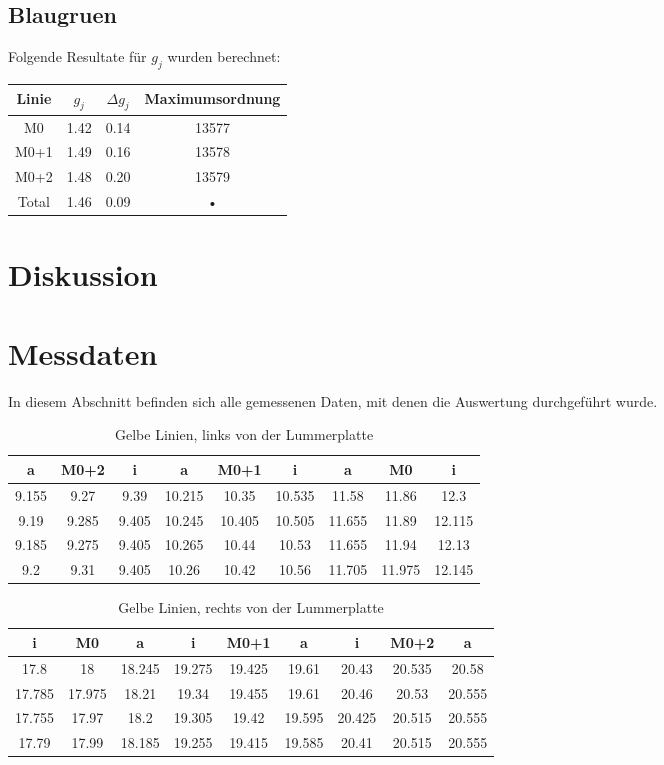\documentclass[a4paper,parskip,11pt, DIV12]{scrreprt}
\begin{document}
	\section{Blaugruen}
	Folgende Resultate für $g_j$ wurden berechnet:
	
\begin{tabular}{|c|c|c|c|}
\hline 
Linie  & $g_j$ & $\Delta g_j$ & Maximumsordnung \\ 
\hline 
M0 & 1.42 & 0.14 & 13577 \\ 
\hline 
M0+1 & 1.49 & 0.16 & 13578 \\ 
\hline 
M0+2 & 1.48 & 0.20 & 13579 \\ 
\hline 
Total & 1.46 & 0.09 & • \\ 
\hline 
\end{tabular} 

	\chapter{Diskussion}
	
	\chapter{Messdaten}
	In diesem Abschnitt befinden sich alle gemessenen Daten, mit denen die Auswertung durchgeführt wurde.
	
	\begin{table}[H]
	\begin{tabular}{|c|c|c||c|c|c||c|c|c|}
	\hline 
a	&	M0+2	&	i	&	a	&	M0+1	&	i	&	a	&	M0	&	i	\\
	\hline
	\hline
9.155	&	9.27	&	9.39	&	10.215	&	10.35	&	10.535	&	11.58	&	11.86	&	12.3	\\
	\hline
9.19	&	9.285	&	9.405	&	10.245	&	10.405	&	10.505	&	11.655	&	11.89	&	12.115	\\
	\hline
9.185	&	9.275	&	9.405	&	10.265	&	10.44	&	10.53	&	11.655	&	11.94	&	12.13	\\
	\hline
9.2	&	9.31	&	9.405	&	10.26	&	10.42	&	10.56	&	11.705	&	11.975	&	12.145	\\
	\hline
	\end{tabular}
	\caption{Gelbe Linien, links von der Lummerplatte}
	\end{table}
	
	\begin{table}[H]	
	\begin{tabular}{|c|c|c||c|c|c||c|c|c|}
	\hline 
i	&	M0	&	a	&	i	&	M0+1	&	a	&	i	&	M0+2	&	a	\\
	\hline
	\hline
17.8	&	18	&	18.245	&	19.275	&	19.425	&	19.61	&	20.43	&	20.535	&	20.58	\\
	\hline
17.785	&	17.975	&	18.21	&	19.34	&	19.455	&	19.61	&	20.46	&	20.53	&	20.555	\\
	\hline
17.755	&	17.97	&	18.2	&	19.305	&	19.42	&	19.595	&	20.425	&	20.515	&	20.555	\\
	\hline
17.79	&	17.99	&	18.185	&	19.255	&	19.415	&	19.585	&	20.41	&	20.515	&	20.555	\\
	\hline
	\end{tabular} 
	\caption{Gelbe Linien, rechts von der Lummerplatte}
	\end{table}
	
\end{document}
